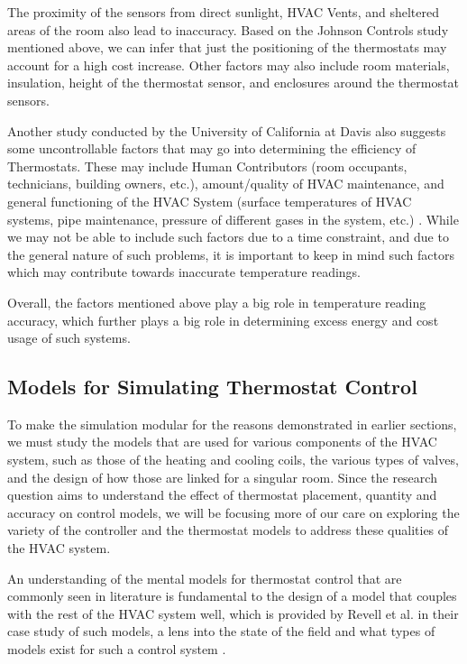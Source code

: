 \documentclass[conference,letterpaper]{IEEEtran}
\begin{document}
The proximity of the sensors from direct sunlight, HVAC Vents, and sheltered areas of the room also lead to inaccuracy. Based on the Johnson Controls study mentioned above, we can infer that just the positioning of the thermostats may account for a high cost increase. Other factors may also include room materials, insulation, height of the thermostat sensor, and enclosures around the thermostat sensors.

Another study conducted by the University of California at Davis also suggests some uncontrollable factors that may go into determining the efficiency of Thermostats. These may include Human Contributors (room occupants, technicians, building owners, etc.), amount/quality of HVAC maintenance, and general functioning of the HVAC System (surface temperatures of HVAC systems, pipe maintenance, pressure of different gases in the system, etc.) \cite{Heinemeier2012UncertaintiesIA}. While we may not be able to include such factors due to a time constraint, and due to the general nature of such problems, it is important to keep in mind such factors which may contribute towards inaccurate temperature readings. 

Overall, the factors mentioned above play a big role in temperature reading accuracy, which further plays a big role in determining excess energy and cost usage of such systems.

\subsection{Models for Simulating Thermostat Control}
To make the simulation modular for the reasons demonstrated in earlier sections, we must study the models that are used for various components of the HVAC system, such as those of the heating and cooling coils, the various types of valves, and the design of how those are linked for a singular room. Since the research question aims to understand the effect of thermostat placement, quantity and accuracy on control models, we will be focusing more of our care on exploring the variety of the controller and the thermostat models to address these qualities of the HVAC system. 

An understanding of the mental models for thermostat control that are commonly seen in literature is fundamental to the design of a model that couples with the rest of the HVAC system well, which is provided by Revell et al. in their case study of such models, a lens into the state of the field and what types of models exist for such a control system \cite{revell_case_2014}. 
\end{document}
